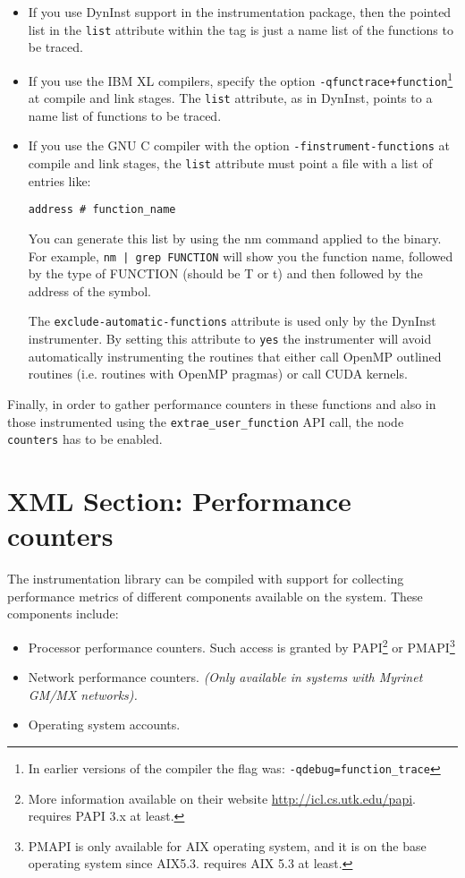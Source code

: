 \begin{itemize}
 \item If you use DynInst support in the instrumentation package, then the pointed list in the {\tt list} attribute within the tag is just a name list of the functions to be traced.

 \item If you use the IBM XL compilers, specify the option {\tt -qfunctrace+function}\footnote{In earlier versions of the compiler the flag was: {\tt -qdebug=function\_trace}} at compile and link stages. The {\tt list} attribute, as in DynInst, points to a name list of functions to be traced.

 \item If you use the GNU C compiler with the option {\tt -finstrument-functions} at compile and link stages, the {\tt list} attribute must point a file with a list of entries like:

{\tt address \# function\_name}

You can generate this list by using the nm command applied to the binary. For example, {\tt nm | grep FUNCTION} will show you the function name, followed by the type of FUNCTION (should be T or t) and then followed by the address of the symbol.

The {\tt exclude-automatic-functions} attribute is used only by the DynInst instrumenter. By setting this attribute to {\tt yes} the instrumenter will avoid automatically instrumenting the routines that either call OpenMP outlined routines (i.e. routines with OpenMP pragmas) or call CUDA kernels.
\end{itemize}

Finally, in order to gather performance counters in these functions and also in those instrumented using the {\tt extrae\_user\_function} API call, the node {\tt counters} has to be enabled.


\section{XML Section: Performance counters}\label{sec:XMLSectionPerformanceCounters}

The instrumentation library can be compiled with support for collecting performance metrics of different components available on the system. These components include:

\begin{itemize}
 \item Processor performance counters. Such access is granted by PAPI\footnote{More information available on their website \url{http://icl.cs.utk.edu/papi}. \TRACE requires PAPI 3.x at least.} or PMAPI\footnote{PMAPI is only available for AIX operating system, and it is on the base operating system since AIX5.3. \TRACE requires AIX 5.3 at least.}
 \item Network performance counters. {\em (Only available in systems with Myrinet GM/MX networks).}
 \item Operating system accounts.
\end{itemize}

